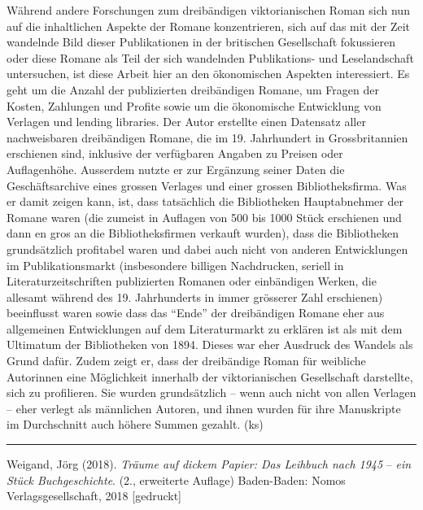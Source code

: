 \documentclass[a4paper,
fontsize=11pt,
oneside,
numbers=noperiodatend,
parskip=half-,
bibliography=totoc,
final
]{scrartcl}
\begin{document}
Während andere Forschungen zum dreibändigen viktorianischen Roman sich
nun auf die inhaltlichen Aspekte der Romane konzentrieren, sich auf das
mit der Zeit wandelnde Bild dieser Publikationen in der britischen
Gesellschaft fokussieren oder diese Romane als Teil der sich wandelnden
Publikations- und Leselandschaft untersuchen, ist diese Arbeit hier an
den ökonomischen Aspekten interessiert. Es geht um die Anzahl der
publizierten dreibändigen Romane, um Fragen der Kosten, Zahlungen und
Profite sowie um die ökonomische Entwicklung von Verlagen und lending
libraries. Der Autor erstellte einen Datensatz aller nachweisbaren
dreibändigen Romane, die im 19. Jahrhundert in Grossbritannien
erschienen sind, inklusive der verfügbaren Angaben zu Preisen oder
Auflagenhöhe. Ausserdem nutzte er zur Ergänzung seiner Daten die
Geschäftsarchive eines grossen Verlages und einer grossen
Bibliotheksfirma. Was er damit zeigen kann, ist, dass tatsächlich die
Bibliotheken Hauptabnehmer der Romane waren (die zumeist in Auflagen von
500 bis 1000 Stück erschienen und dann en gros an die Bibliotheksfirmen
verkauft wurden), dass die Bibliotheken grundsätzlich profitabel waren
und dabei auch nicht von anderen Entwicklungen im Publikationsmarkt
(insbesondere billigen Nachdrucken, seriell in Literaturzeitschriften
publizierten Romanen oder einbändigen Werken, die allesamt während des
19. Jahrhunderts in immer grösserer Zahl erschienen) beeinflusst waren
sowie dass das \enquote{Ende} der dreibändigen Romane eher aus
allgemeinen Entwicklungen auf dem Literaturmarkt zu erklären ist als mit
dem Ultimatum der Bibliotheken von 1894. Dieses war eher Ausdruck des
Wandels als Grund dafür. Zudem zeigt er, dass der dreibändige Roman für
weibliche Autorinnen eine Möglichkeit innerhalb der viktorianischen
Gesellschaft darstellte, sich zu profilieren. Sie wurden grundsätzlich
-- wenn auch nicht von allen Verlagen -- eher verlegt als männlichen
Autoren, und ihnen wurden für ihre Manuskripte im Durchschnitt auch
höhere Summen gezahlt. (ks)

\begin{center}\rule{0.5\linewidth}{0.5pt}\end{center}

Weigand, Jörg (2018). \emph{Träume auf dickem Papier: Das Leihbuch nach
1945} -- \emph{ein Stück Buchgeschichte}. (2., erweiterte Auflage)
Baden-Baden: Nomos Verlagsgesellschaft, 2018 {[}gedruckt{]}
\end{document}
